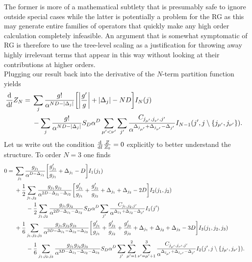 \documentclass[english, parskip=full]{scrartcl}
\begin{document}
The former is more of a mathematical subtlety that is presumably safe to ignore outside special cases while the latter is potentially a problem for the RG as this may generate entire families of operators that quickly make any high order calculation completely infeasible.
An argument that is somewhat symptomatic of RG is therefore to use the tree-level scaling as a justification for throwing away highly irrelevant terms that appear in this way without looking at their contributions at higher orders.\\
Plugging our result back into the derivative of the $N$-term partition function yields
\begin{align}
\frac{\d}{\d l} Z_N &= \bsplit{&\sum_j \frac{g!}{\alpha^{ND-|\Delta_j|}} \klb*{ \abs*{\frac{g'}{g}} + |\Delta_j| - ND }I_N(j) \\
&- \sum_j \frac{g!}{\alpha^{ND - |\Delta_j|}} S_D\alpha^D \sum_{\mu'<\nu'} \sum_{j'} \frac{C_{j_{\mu'}, j_{\nu'}, j'}}{\alpha^{\Delta_{j_{\mu'}} + \Delta_{j_{\nu'}} - \Delta_{j'}}} I_{N-1}(j',j\setminus \klc*{j_{\mu'}, j_{\nu'}}).}
\end{align}
Let us write out the condition $\frac{\text{d}}{\text{d} l} \frac{Z}{Z_0} = 0$ explicitly to better understand the structure.
To order $N=3$ one finds
\begin{align}
0 &= \bsplit{&\sum_{j_1} \frac{g_{j_1}}{\alpha^{D-\Delta_{j_1}}} \klb*{\frac{g_{j_1}'}{g_{j_1}} + \Delta_{j_1} - D} I_1(j_1)\\
& + \frac{1}{2}\sum_{j_1,j_2} \frac{g_{j_1}g_{j_2}}{\alpha^{2D-\Delta_{j_1} - \Delta_{j_2}}} \klb*{\frac{g_{j_1}'}{g_{j_1}} + \frac{g_{j_2}'}{g_{j_2}} + \Delta_{j_1} + \Delta_{j_2} - 2D} I_2(j_1,j_2)\\
&\qquad - \frac{1}{2}\sum_{j_1,j_2} \frac{g_{j_1}g_{j_2}}{\alpha^{2D-\Delta_{j_1} - \Delta_{j_2}}} S_D\alpha^D \sum_{j'} \frac{C_{j_{1}, j_{2}, j'}}{\alpha^{\Delta_{j_{1}} + \Delta_{j_{2}} - \Delta_{j'}}} I_{1}(j')\\
& + \frac{1}{6}\sum_{j_1,j_2,j_3} \frac{g_{j_1}g_{j_2}g_{j_3}}{\alpha^{3D-\Delta_{j_1} - \Delta_{j_2} - \Delta_{j_3}}} \klb*{\frac{g_{j_1}'}{g_{j_1}} + \frac{g_{j_2}'}{g_{j_2}} + \frac{g_{j_3}'}{g_{j_3}} + \Delta_{j_1}+ \Delta_{j_2} + \Delta_{j_3} - 3D} I_3(j_1,j_2,j_3)\\
&\qquad - \frac{1}{6}\sum_{j_1,j_2,j_3} \frac{g_{j_1}g_{j_2}g_{j_3}}{\alpha^{3D-\Delta_{j_1} - \Delta_{j_2} - \Delta_{j_3}}} S_D\alpha^D \sum_{j'} \sum_{\mu'=1}^2 \sum_{\nu'=\mu'+1}^3 \frac{C_{j_{\mu'}, j_{\nu'}, j'}}{\alpha^{\Delta_{j_{\mu'}} + \Delta_{j_{\nu'}} - \Delta_{j'}}} I_{2}(j',j\setminus \klc*{j_{\mu'}, j_{\nu'}}).}
\end{align}
\end{document}
